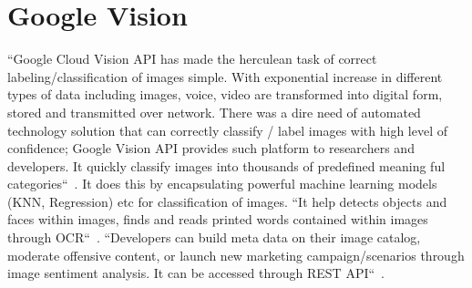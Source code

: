 \section{Google Vision}

``Google Cloud Vision API has made the herculean task of correct 
labeling/classification of images simple. With exponential increase 
in different types of data including images, voice, video are 
transformed into digital form, stored and transmitted over network. 
There was a dire need of automated technology solution that can 
correctly classify / label images with high level of confidence; 
Google Vision API provides such platform to researchers and developers. 
It quickly classify images into thousands of predefined 
meaning ful categories``~\cite{hid-sp18-523-www-google-vision}. 
It does this by encapsulating powerful machine learning 
models (KNN, Regression) etc for classification of images. 
``It help detects objects and faces within images, finds and reads 
printed words contained within images through 
OCR``~\cite{hid-sp18-523-www-google-vision}. 
``Developers can build meta data on their image catalog, moderate 
offensive content, or launch new marketing campaign/scenarios through 
image sentiment analysis. It can be accessed 
through REST API``~\cite{hid-sp18-523-www-google-vision}.

